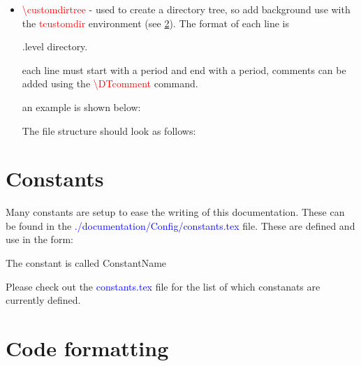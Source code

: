 \begin{itemize}
	\item \begin{minipage}[t]{\textwidth} 
	\textcolor{red}{\textbackslash{customdirtree}} - used to create a directory tree, so add background use with the \textcolor{red}{tcustomdir} environment (see \ref{ch:documentation:code_format}). The format of each line is 
	\begin{textbox}
	.{level} {directory}.
	\end{textbox}
	\noindent each line must start with a period and end with a period, comments can be added using the \textcolor{red}{\textbackslash{DTcomment}} command.

	\noindent an example is shown below:
	\begin{latexbox}
	The file structure should look as follows:
\begin{tcustomdir}
\end{tcustomdir}
	\end{latexbox}
	\end{minipage}

\end{itemize}


\clearpage
\newpage
\section{Constants}
\label{ch:documentation:constants}

Many constants are setup to ease the writing of this documentation. These can be found in the \textcolor{blue}{./documentation/Config/constants.tex} file. These are defined and use in the form:
\begin{latexbox}
\newcommand{\ConstantName}{ConstantName}
The constant is called \ConstantName
\end{latexbox}

\noindent Please check out the \textcolor{blue}{constants.tex} file for the list of which constanats are currently defined.

\section{Code formatting}
\label{ch:documentation:code_format}


